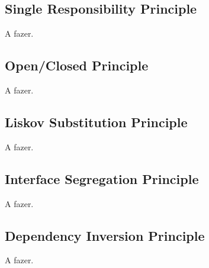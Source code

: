 \subsection{Single Responsibility Principle}
A fazer.

\subsection{Open/Closed Principle}
A fazer.

\subsection{Liskov Substitution Principle}
A fazer.

\subsection{Interface Segregation Principle}
A fazer.  

\subsection{Dependency Inversion Principle}
A fazer.

